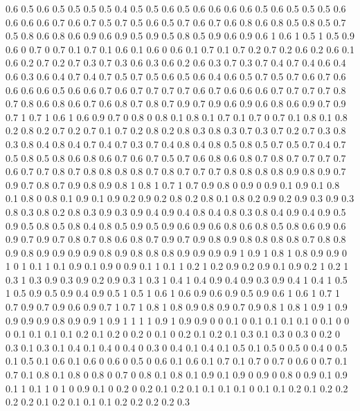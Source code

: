 0.6 0.5
0.6 0.5
0.5 0.5
0.5 0.4
0.5 0.5
0.6 0.5
0.6 0.6
0.6 0.6
0.5 0.6
0.5 0.5
0.5 0.6
0.6 0.6
0.6 0.7
0.6 0.7
0.5 0.7
0.5 0.6
0.5 0.7
0.6 0.7
0.6 0.8
0.6 0.8
0.5 0.8
0.5 0.7
0.5 0.8
0.6 0.8
0.6 0.9
0.6 0.9
0.5 0.9
0.5 0.8
0.5 0.9
0.6 0.9
0.6 1
0.6 1
0.5 1
0.5 0.9
0.6 0
0.7 0
0.7 0.1
0.7 0.1
0.6 0.1
0.6 0
0.6 0.1
0.7 0.1
0.7 0.2
0.7 0.2
0.6 0.2
0.6 0.1
0.6 0.2
0.7 0.2
0.7 0.3
0.7 0.3
0.6 0.3
0.6 0.2
0.6 0.3
0.7 0.3
0.7 0.4
0.7 0.4
0.6 0.4
0.6 0.3
0.6 0.4
0.7 0.4
0.7 0.5
0.7 0.5
0.6 0.5
0.6 0.4
0.6 0.5
0.7 0.5
0.7 0.6
0.7 0.6
0.6 0.6
0.6 0.5
0.6 0.6
0.7 0.6
0.7 0.7
0.7 0.7
0.6 0.7
0.6 0.6
0.6 0.7
0.7 0.7
0.7 0.8
0.7 0.8
0.6 0.8
0.6 0.7
0.6 0.8
0.7 0.8
0.7 0.9
0.7 0.9
0.6 0.9
0.6 0.8
0.6 0.9
0.7 0.9
0.7 1
0.7 1
0.6 1
0.6 0.9
0.7 0
0.8 0
0.8 0.1
0.8 0.1
0.7 0.1
0.7 0
0.7 0.1
0.8 0.1
0.8 0.2
0.8 0.2
0.7 0.2
0.7 0.1
0.7 0.2
0.8 0.2
0.8 0.3
0.8 0.3
0.7 0.3
0.7 0.2
0.7 0.3
0.8 0.3
0.8 0.4
0.8 0.4
0.7 0.4
0.7 0.3
0.7 0.4
0.8 0.4
0.8 0.5
0.8 0.5
0.7 0.5
0.7 0.4
0.7 0.5
0.8 0.5
0.8 0.6
0.8 0.6
0.7 0.6
0.7 0.5
0.7 0.6
0.8 0.6
0.8 0.7
0.8 0.7
0.7 0.7
0.7 0.6
0.7 0.7
0.8 0.7
0.8 0.8
0.8 0.8
0.7 0.8
0.7 0.7
0.7 0.8
0.8 0.8
0.8 0.9
0.8 0.9
0.7 0.9
0.7 0.8
0.7 0.9
0.8 0.9
0.8 1
0.8 1
0.7 1
0.7 0.9
0.8 0
0.9 0
0.9 0.1
0.9 0.1
0.8 0.1
0.8 0
0.8 0.1
0.9 0.1
0.9 0.2
0.9 0.2
0.8 0.2
0.8 0.1
0.8 0.2
0.9 0.2
0.9 0.3
0.9 0.3
0.8 0.3
0.8 0.2
0.8 0.3
0.9 0.3
0.9 0.4
0.9 0.4
0.8 0.4
0.8 0.3
0.8 0.4
0.9 0.4
0.9 0.5
0.9 0.5
0.8 0.5
0.8 0.4
0.8 0.5
0.9 0.5
0.9 0.6
0.9 0.6
0.8 0.6
0.8 0.5
0.8 0.6
0.9 0.6
0.9 0.7
0.9 0.7
0.8 0.7
0.8 0.6
0.8 0.7
0.9 0.7
0.9 0.8
0.9 0.8
0.8 0.8
0.8 0.7
0.8 0.8
0.9 0.8
0.9 0.9
0.9 0.9
0.8 0.9
0.8 0.8
0.8 0.9
0.9 0.9
0.9 1
0.9 1
0.8 1
0.8 0.9
0.9 0
1 0
1 0.1
1 0.1
0.9 0.1
0.9 0
0.9 0.1
1 0.1
1 0.2
1 0.2
0.9 0.2
0.9 0.1
0.9 0.2
1 0.2
1 0.3
1 0.3
0.9 0.3
0.9 0.2
0.9 0.3
1 0.3
1 0.4
1 0.4
0.9 0.4
0.9 0.3
0.9 0.4
1 0.4
1 0.5
1 0.5
0.9 0.5
0.9 0.4
0.9 0.5
1 0.5
1 0.6
1 0.6
0.9 0.6
0.9 0.5
0.9 0.6
1 0.6
1 0.7
1 0.7
0.9 0.7
0.9 0.6
0.9 0.7
1 0.7
1 0.8
1 0.8
0.9 0.8
0.9 0.7
0.9 0.8
1 0.8
1 0.9
1 0.9
0.9 0.9
0.9 0.8
0.9 0.9
1 0.9
1 1
1 1
0.9 1
0.9 0.9
0 0
0.1 0
0.1 0.1
0.1 0.1
0 0.1
0 0
0 0.1
0.1 0.1
0.1 0.2
0.1 0.2
0 0.2
0 0.1
0 0.2
0.1 0.2
0.1 0.3
0.1 0.3
0 0.3
0 0.2
0 0.3
0.1 0.3
0.1 0.4
0.1 0.4
0 0.4
0 0.3
0 0.4
0.1 0.4
0.1 0.5
0.1 0.5
0 0.5
0 0.4
0 0.5
0.1 0.5
0.1 0.6
0.1 0.6
0 0.6
0 0.5
0 0.6
0.1 0.6
0.1 0.7
0.1 0.7
0 0.7
0 0.6
0 0.7
0.1 0.7
0.1 0.8
0.1 0.8
0 0.8
0 0.7
0 0.8
0.1 0.8
0.1 0.9
0.1 0.9
0 0.9
0 0.8
0 0.9
0.1 0.9
0.1 1
0.1 1
0 1
0 0.9
0.1 0
0.2 0
0.2 0.1
0.2 0.1
0.1 0.1
0.1 0
0.1 0.1
0.2 0.1
0.2 0.2
0.2 0.2
0.1 0.2
0.1 0.1
0.1 0.2
0.2 0.2
0.2 0.3

